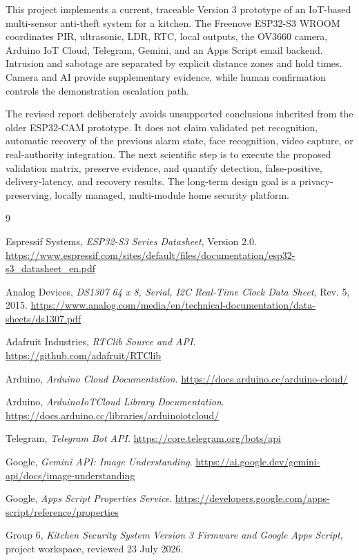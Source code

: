 \documentclass[11pt,a4paper]{report}
\begin{document}
This project implements a current, traceable Version 3 prototype of an
IoT-based multi-sensor anti-theft system for a kitchen. The Freenove ESP32-S3
WROOM coordinates PIR, ultrasonic, LDR, RTC, local outputs, the OV3660 camera,
Arduino IoT Cloud, Telegram, Gemini, and an Apps Script email backend.
Intrusion and sabotage are separated by explicit distance zones and hold
times. Camera and AI provide supplementary evidence, while human confirmation
controls the demonstration escalation path.

The revised report deliberately avoids unsupported conclusions inherited from
the older ESP32-CAM prototype. It does not claim validated pet recognition,
automatic recovery of the previous alarm state, face recognition, video
capture, or real-authority integration. The next scientific step is to execute
the proposed validation matrix, preserve evidence, and quantify detection,
false-positive, delivery-latency, and recovery results. The long-term design
goal is a privacy-preserving, locally managed, multi-module home security
platform.

\begin{thebibliography}{9}

Espressif Systems,
\emph{ESP32-S3 Series Datasheet}, Version 2.0.
\url{https://www.espressif.com/sites/default/files/documentation/esp32-s3_datasheet_en.pdf}

Analog Devices,
\emph{DS1307 64 x 8, Serial, I2C Real-Time Clock Data Sheet}, Rev. 5, 2015.
\url{https://www.analog.com/media/en/technical-documentation/data-sheets/ds1307.pdf}

Adafruit Industries,
\emph{RTClib Source and API}.
\url{https://github.com/adafruit/RTClib}

Arduino,
\emph{Arduino Cloud Documentation}.
\url{https://docs.arduino.cc/arduino-cloud/}

Arduino,
\emph{ArduinoIoTCloud Library Documentation}.
\url{https://docs.arduino.cc/libraries/arduinoiotcloud/}

Telegram,
\emph{Telegram Bot API}.
\url{https://core.telegram.org/bots/api}

Google,
\emph{Gemini API: Image Understanding}.
\url{https://ai.google.dev/gemini-api/docs/image-understanding}

Google,
\emph{Apps Script Properties Service}.
\url{https://developers.google.com/apps-script/reference/properties}

Group 6,
\emph{Kitchen Security System Version 3 Firmware and Google Apps Script},
project workspace, reviewed 23 July 2026.

\end{thebibliography}
\end{document}
